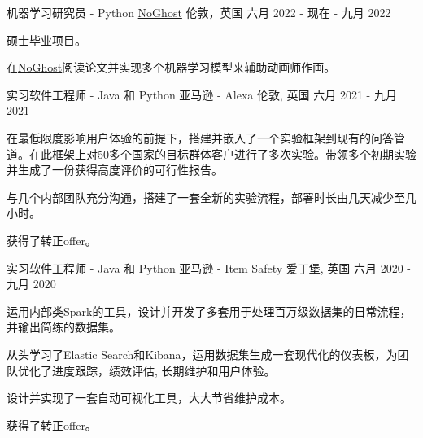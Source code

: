 

\begin{cventries}

    \cventry
    {机器学习研究员 - Python} %
    {\href{https://www.noghost.co.uk/}{NoGhost}} %
    {伦敦，英国} %
    {六月 2022 - 现在 - 九月 2022} %
    {
      \begin{cvitems} %
        \item {硕士毕业项目。}
        \item {在\href{https://www.noghost.co.uk/}{NoGhost}阅读论文并实现多个机器学习模型来辅助动画师作画。}
      \end{cvitems}
    }

  \cventry
    {实习软件工程师 - Java 和 Python} %
    {亚马逊 - Alexa} %
    {伦敦, 英国} %
    {六月 2021 - 九月 2021} %
    {
      \begin{cvitems} %
        \item {在最低限度影响用户体验的前提下，搭建并嵌入了一个实验框架到现有的问答管道。在此框架上对50多个国家的目标群体客户进行了多次实验。带领多个初期实验并生成了一份获得高度评价的可行性报告。}
        \item {与几个内部团队充分沟通，搭建了一套全新的实验流程，部署时长由几天减少至几小时。}
        \item {获得了转正offer。}
      \end{cvitems}
    }

  \cventry
    {实习软件工程师 - Java 和 Python} %
    {亚马逊 - Item Safety} %
    {爱丁堡, 英国} %
    {六月 2020 - 九月 2020} %
    {
      \begin{cvitems} %
        \item {运用内部类Spark的工具，设计并开发了多套用于处理百万级数据集的日常流程，并输出简练的数据集。}
        \item {从头学习了Elastic Search和Kibana，运用数据集生成一套现代化的仪表板，为团队优化了进度跟踪，绩效评估, 长期维护和用户体验。}
        \item {设计并实现了一套自动可视化工具，大大节省维护成本。}
        \item {获得了转正offer。}
      \end{cvitems}
    }


\end{cventries}
